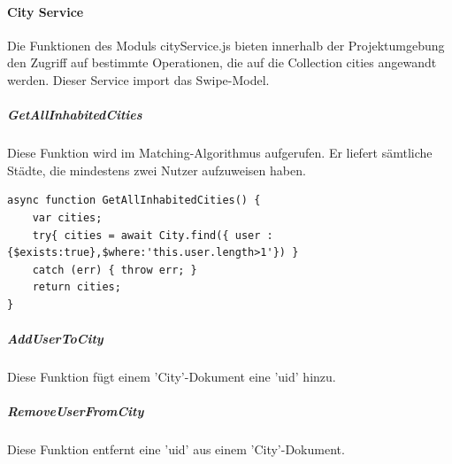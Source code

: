 %
%
\paragraph{City Service}
Die Funktionen des Moduls cityService.js bieten innerhalb der Projektumgebung den Zugriff auf bestimmte Operationen, die auf die Collection cities angewandt werden. Dieser Service import das Swipe-Model.

\subparagraph{GetAllInhabitedCities}
Diese Funktion wird im Matching-Algorithmus aufgerufen. Er liefert sämtliche Städte, die mindestens zwei Nutzer aufzuweisen haben. 

\begin{lstlisting}[caption=City Service - GetAllInhabitedCities, label=lst:cityServiceGetAllInhabitedCities]
async function GetAllInhabitedCities() {
    var cities;
    try{ cities = await City.find({ user : {$exists:true},$where:'this.user.length>1'}) }
    catch (err) { throw err; }
    return cities;
}
\end{lstlisting}


\subparagraph{AddUserToCity}
Diese Funktion fügt einem 'City'-Dokument eine 'uid' hinzu.

\subparagraph{RemoveUserFromCity}
Diese Funktion entfernt eine 'uid' aus einem 'City'-Dokument.
